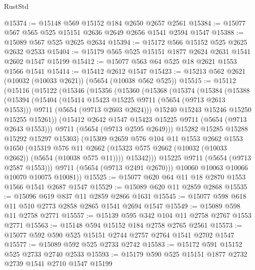 \begin{lexlean}{RustStd}
\begin{coremodule}
@15374 := @15148 @569 @15152 @184 @2650 @2657 @2561
@15384 := @15077 @567 @565 @525 @15151 @2636 @2649 @2656 @1541 @2594 @1547
@15388 := @15089 @567 @525 @2625 @2634
@15394 := @15172 @566 @15152 @525 @2625 @2632 @2533
@15404 := @15179 @565 @525 @15151 @1877 @2624 @2631 @1541 @2602 @1547 @15199
@15412 := @15077 @563 @64 @525 @18 @2621 @1553 @1566 @1541
@15414 := @15412 @2612 @1547
@15423 := @15213 @562 @2621 (@10032 (@10033 @2621)) (@5654 (@10038 @562 @525))
@15515 := @15112
    (@15116
      (@15122
        (@15346
          (@15356
            (@15360
              (@15368
                (@15374
                  (@15384
                    (@15388
                      (@15394
                        (@15404
                          (@15414 @15423 @15225 @9711 (@5654 (@9713 @2613 @1553)))
                          @9711
                          (@5654 (@9713 @2603 @2624)))
                        @15240
                        @15243
                        @15246
                        @15250
                        @15255
                        @15261))
                    (@15412 @2642 @1547 @15423 @15225 @9711 (@5654 (@9713 @2643 @1553)))
                    @9711
                    (@5654 (@9713 @2595 @2649)))
                  @15282
                  @15285
                  @15288
                  @15292
                  @15297
                  @15303)
                (@15309
                  @2659
                  @576
                  @104
                  @11
                  @1553
                  @2662
                  @1553
                  @1650
                  (@15319
                    @576
                    @11
                    @2662
                    (@15323 @575 @2662 (@10032 (@10033 @2662)) (@5654 (@10038 @575 @11))))
                  @15342)))
            @15225
            @9711
            (@5654 (@9713 @2587 @1553)))
          @9711
          (@5654 (@9713 @2491 @2670)))
        @10060
        @10063
        @10066
        @10070
        @10075
        @10081))
@15525 := @15077 @620 @64 @11 @18 @2870 @1553 @1566 @1541 @2687 @1547
@15529 := @15089 @620 @11 @2859 @2868
@15535 := @15096 @619 @837 @11 @2859 @2866 @1631
@15545 := @15077 @598 @618 @11 @510 @2773 @2858 @2865 @1541 @2694 @1547
@15549 := @15089 @598 @11 @2758 @2771
@15557 := @15139 @595 @342 @104 @11 @2758 @2767 @1553 @2771
@15563 := @15148 @594 @15152 @184 @2758 @2765 @2561
@15573 := @15077 @592 @590 @525 @15151 @2744 @2757 @2764 @1541 @2702 @1547
@15577 := @15089 @592 @525 @2733 @2742
@15583 := @15172 @591 @15152 @525 @2733 @2740 @2533
@15593 := @15179 @590 @525 @15151 @1877 @2732 @2739 @1541 @2710 @1547 @15199

\end{coremodule}
\end{lexlean}
